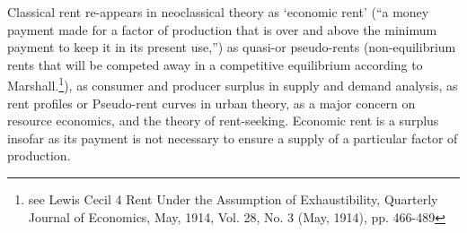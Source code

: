 


% 




Classical rent re-appears in neoclassical theory as `economic rent' (``a money payment made for a factor of production that is over and above the minimum payment to keep it in its present use,'')  as quasi-or pseudo-rents (non-equilibrium rents that will be competed away in a competitive equilibrium according to Marshall.\footnote{see Lewis Cecil 4 Rent Under the Assumption of Exhaustibility, Quarterly Journal of Economics, May, 1914, Vol. 28, No. 3 (May, 1914), pp. 466-489}),  as consumer  and producer surplus in supply and demand analysis,  as rent profiles or Pseudo-rent curves in urban theory, as a major concern on resource economics, and the theory of rent-seeking. Economic rent is a surplus insofar as its payment is not necessary to ensure a supply of a particular factor of production. 



